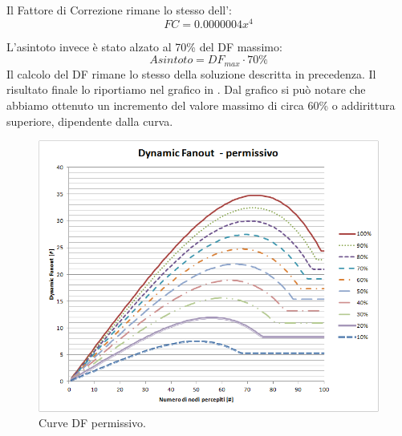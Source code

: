 Il Fattore di Correzione rimane lo stesso dell':
\begin{equation}
	FC = 0.0000004x^4 \nonumber
\end{equation}

L'asintoto invece è stato alzato al 70\% del DF massimo:
\begin{equation}
	\label{eq:df_asintoto_perm}
	Asintoto = DF_{max}\cdot 70\%
\end{equation}
Il calcolo del DF rimane lo stesso della soluzione descritta in precedenza. Il risultato finale lo riportiamo nel grafico in . Dal grafico si può notare che abbiamo ottenuto un incremento del valore massimo di circa 60\% o addirittura superiore, dipendente dalla curva.
\begin{figure}[t]
	\centering
	\includegraphics[width=0.9\linewidth]{Images/grafici_usati/DF_permissivo_tot_no_arr}
	\caption[DF permissivo]{Curve DF permissivo.}
	\label{fig:DF_permissivo_tot_no_arr}
\end{figure}
\bigskip


